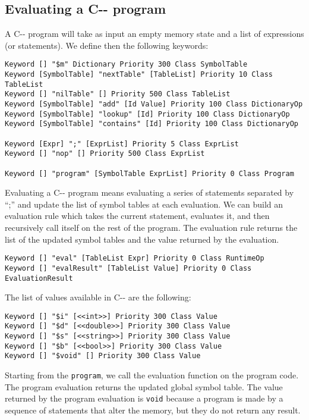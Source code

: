 \subsection{Evaluating a C-{}- program}
A C-{}- program will take as input an empty memory state and a list of expressions (or statements). We define then the following keywords:

\begin{lstlisting}
Keyword [] "$m" Dictionary Priority 300 Class SymbolTable
Keyword [SymbolTable] "nextTable" [TableList] Priority 10 Class TableList
Keyword [] "nilTable" [] Priority 500 Class TableList
Keyword [SymbolTable] "add" [Id Value] Priority 100 Class DictionaryOp
Keyword [SymbolTable] "lookup" [Id] Priority 100 Class DictionaryOp
Keyword [SymbolTable] "contains" [Id] Priority 100 Class DictionaryOp

Keyword [Expr] ";" [ExprList] Priority 5 Class ExprList
Keyword [] "nop" [] Priority 500 Class ExprList

Keyword [] "program" [SymbolTable ExprList] Priority 0 Class Program
\end{lstlisting}

\noindent
Evaluating a C-{}- program means evaluating a series of statements separated by ``;'' and update the list of symbol tables at each evaluation. We can build an evaluation rule which takes the current statement, evaluates it, and then recursively call itself on the rest of the program. The evaluation rule returns the list of the updated symbol tables and the value returned by the evaluation.

\begin{lstlisting}
Keyword [] "eval" [TableList Expr] Priority 0 Class RuntimeOp
Keyword [] "evalResult" [TableList Value] Priority 0 Class EvaluationResult
\end{lstlisting}

The list of values available in C-{}- are the following:

\begin{lstlisting}
Keyword [] "$i" [<<int>>] Priority 300 Class Value
Keyword [] "$d" [<<double>>] Priority 300 Class Value
Keyword [] "$s" [<<string>>] Priority 300 Class Value
Keyword [] "$b" [<<bool>>] Priority 300 Class Value
Keyword [] "$void" [] Priority 300 Class Value
\end{lstlisting}

Starting from the \texttt{program}, we call the evaluation function on the program code. The program evaluation returns the updated global symbol table. The value returned by the program evaluation is \texttt{void} because a program is made by a sequence of statements that alter the memory, but they do not return any result.

